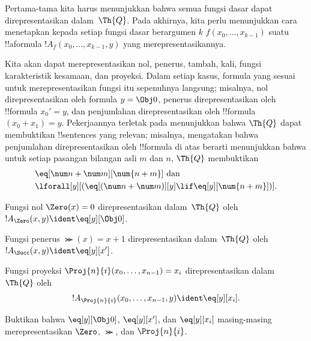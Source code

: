 \documentclass[../../../include/open-logic-section]{subfiles}
\begin{document}

Pertama-tama kita harus menunjukkan bahwa semua fungsi dasar dapat
direpresentasikan dalam~$\Th{Q}$. Pada akhirnya, kita perlu menunjukkan cara
menetapkan kepada setiap fungsi dasar berargumen $k$
$f(x_0,\dots,x_{k-1})$ suatu !!a{formula}
$!A_f(x_0,\dots,x_{k-1},y)$ yang merepresentasikannya.

Kita akan dapat merepresentasikan nol, penerus, tambah, kali, fungsi
karakteristik kesamaan, dan proyeksi. Dalam setiap kasus, formula yang sesuai
untuk merepresentasikan fungsi itu sepenuhnya langsung; misalnya, nol
direpresentasikan oleh formula $y = \Obj 0$, penerus direpresentasikan oleh
!!{formula} $x_0' = y$, dan penjumlahan direpresentasikan oleh !!{formula}
$(x_0 + x_1) = y$. Pekerjaannya terletak pada menunjukkan bahwa $\Th{Q}$
dapat membuktikan !!{sentence}s yang relevan; misalnya, mengatakan bahwa
penjumlahan direpresentasikan oleh !!{formula} di atas berarti menunjukkan
bahwa untuk setiap pasangan bilangan asli $m$ dan $n$, $\Th{Q}$ membuktikan
\begin{align*}
& \eq[\num n + \num m][\num {n+m}] \text{ dan}\\
& \lforall[y][(\eq[(\num n + \num m)][y] \lif \eq[y][\num{n+m}])].
\end{align*}

\begin{prop}
Fungsi nol $\Zero(x) = 0$ direpresentasikan dalam~$\Th{Q}$ oleh
$!A_{\Zero}(x,y) \ident \eq[y][\Obj 0]$.
\end{prop}

\begin{prop}
Fungsi penerus $\Succ(x) = x+1$ direpresentasikan dalam~$\Th{Q}$ oleh
$!A_{\Succ}(x,y) \ident \eq[y][x']$.
\end{prop}

\begin{prop}
Fungsi proyeksi $\Proj{n}{i}(x_0, \dots, x_{n-1}) = x_i$
direpresentasikan dalam~$\Th{Q}$ oleh
\[!A_{\Proj{n}{i}}(x_0, \dots, x_{n-1}, y) \ident \eq[y][x_i].\]
\end{prop}

\begin{prob}
Buktikan bahwa $\eq[y][\Obj 0]$, $\eq[y][x']$, dan $\eq[y][x_i]$
masing-masing merepresentasikan $\Zero$, $\Succ$, dan $\Proj{n}{i}$.
\end{prob}
\end{document}
